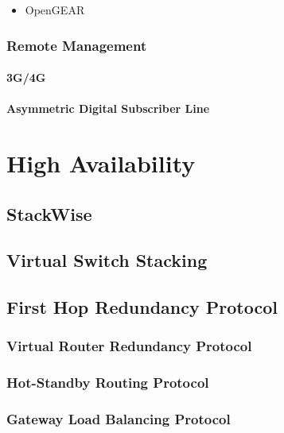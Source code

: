 \begin{itemize}
	\item OpenGEAR
\end{itemize}

\subsection[Remote Mgmt]{Remote Management}

\subsubsection{3G/4G}

\subsubsection[ADSL]{Asymmetric Digital Subscriber Line}

\chapter[HA]{High Availability}

\section{StackWise}

\section[VSS]{Virtual Switch Stacking}

\section[FHRP]{First Hop Redundancy Protocol}

\subsection[VRRP]{Virtual Router Redundancy Protocol}

\subsection[HSRP]{Hot-Standby Routing Protocol}

\subsection[GLBP]{Gateway Load Balancing Protocol}